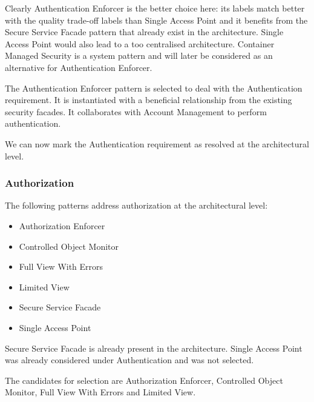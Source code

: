 \documentclass[a4paper,11pt]{report}
\begin{document}
Clearly Authentication Enforcer is the better choice here: its labels match better with the quality trade-off labels
than Single Access Point and it benefits from the Secure Service Facade pattern that already exist in the architecture.
Single Access Point would also lead to a too centralised architecture. Container Managed Security is a system pattern and will later be considered as an alternative for Authentication Enforcer.

The Authentication Enforcer pattern is selected to deal with the Authentication requirement. It is instantiated with a beneficial relationship from the existing security facades. It collaborates with Account Management to perform authentication.

We can now mark the Authentication requirement as resolved at the architectural level.

\subsubsection{Authorization}

The following patterns address authorization at the architectural level:
\begin{itemize}
\item Authorization Enforcer
\item Controlled Object Monitor
\item Full View With Errors
\item Limited View
\item Secure Service Facade
\item Single Access Point
\end{itemize}

Secure Service Facade is already present in the architecture.
Single Access Point was already considered under Authentication and was not selected.

The candidates for selection are Authorization Enforcer, Controlled Object Monitor, Full View With Errors
and Limited View.
\end{document}
